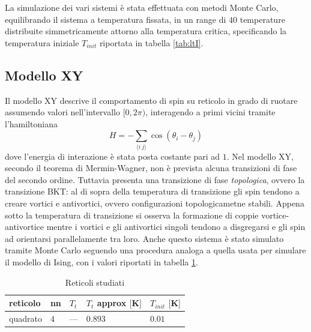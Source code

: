 \documentclass{article}
\begin{document}
La simulazione dei vari sistemi è stata effettuata con metodi Monte Carlo, equilibrando il sistema a temperatura fissata, in un range di $40$ temperature distribuite simmetricamente attorno alla temperatura critica, specificando la temperatura iniziale $T_{init}$ riportata in tabella \ref{tab:ltI}.
\subsection{Modello XY}
Il modello XY descrive il comportamento di spin su reticolo in grado di ruotare assumendo valori nell'intervallo $[0,2\pi)$, interagendo a primi vicini tramite l'hamiltoniana
\begin{equation}
H=-\sum_{\langle i~j\rangle} \cos(\theta_i-\theta_j)
\end{equation}
dove l'energia di interazione è stata posta costante pari ad $1$. Nel modello XY,  secondo il teorema di Mermin-Wagner, non è prevista alcuna transizioni di fase del secondo ordine. Tuttavia presenta una transizione di fase \emph{topologica}, ovvero la transizione BKT\cite{kosterlitz}: al di sopra della temperatura di transizione gli spin tendono a creare vortici e antivortici, ovvero configurazioni topologicametne stabili.
Appena sotto la temperatura di transizione si osserva la formazione di coppie vortice-antivortice mentre i vortici e gli antivortici singoli tendono a disgregarsi e gli spin ad orientarsi parallelamente tra loro.
Anche questo sistema è stato simulato tramite Monte Carlo seguendo una procedura analoga a quella usata per simulare il modello di Ising, con i valori riportati in tabella \ref{tab:ltXY}.
\begin{table}[h]
\begin{center}
\begin{tabular}{lllll}
\toprule
reticolo & nn & $T_t$ & $T_t$ approx $[$\si{K}$]$ & $T_{init}$ $[$\si{K}$]$\\
\midrule
quadrato & $4$ & --- & $0.893$ & $0.01$\\
\bottomrule
\end{tabular}
\end{center}
\caption{Reticoli studiati}
\label{tab:ltXY}
\end{table}
\end{document}
